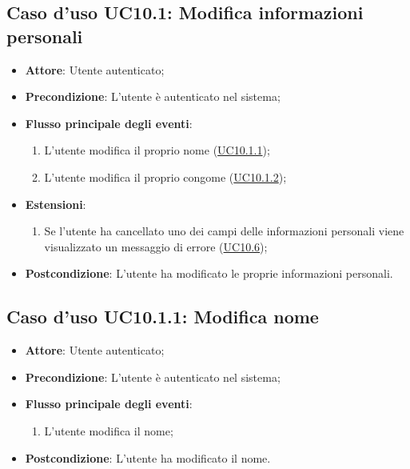 \documentclass[12pt,a4paper]{article}
\begin{document}
\subsection{Caso d'uso UC10.1: Modifica informazioni personali}

\begin{itemize}

\item \textbf{Attore}: Utente autenticato; 
\item \textbf{Precondizione}: L'utente è autenticato nel sistema;

\item \textbf{Flusso principale degli eventi}:
\begin{enumerate}
	\item L’utente modifica il proprio nome (\hyperlink{UC10.1.1}{UC10.1.1});
	\item L’utente modifica il proprio congome (\hyperlink{UC10.1.2}{UC10.1.2});
	
\end{enumerate}
\item \textbf{Estensioni}:
\begin{enumerate}
	\item Se l'utente ha cancellato uno dei campi delle informazioni personali viene visualizzato un messaggio di errore (\hyperlink{UC10.6}{UC10.6});
	
\end{enumerate}
\item \textbf{Postcondizione}: L'utente ha modificato le proprie informazioni personali.
\end{itemize}
\hypertarget{UC10.1.1}{}
\subsection{Caso d'uso UC10.1.1: Modifica nome}

\begin{itemize}

\item \textbf{Attore}: Utente autenticato; 
\item \textbf{Precondizione}: L'utente è autenticato nel sistema;

\item \textbf{Flusso principale degli eventi}:
\begin{enumerate}
	\item L'utente modifica il nome;
	
\end{enumerate}
\item \textbf{Postcondizione}: L'utente ha modificato il nome.
\end{itemize}
\hypertarget{UC10.1.2}{}
\end{document}
